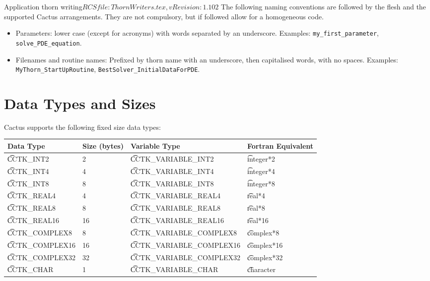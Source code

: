 \begin{cactuspart}{2}{Application thorn writing}{$RCSfile: ThornWriters.tex,v $}{$Revision: 1.102 $}
The following naming conventions are followed by the flesh and the
supported Cactus arrangements. They are not compulsory, but if followed
allow for a homogeneous code.

\begin{itemize}

\item Parameters: lower case (except for acronyms) with words separated
  by an underscore. Examples: {\tt my\_first\_parameter},
  {\tt solve\_PDE\_equation}.

\item Filenames and routine names: Prefixed by thorn name with an underscore, then capitalised words, with no spaces.
    Examples: {\tt MyThorn\_StartUpRoutine}, {\tt BestSolver\_InitialDataForPDE}.

\end{itemize}

\section{Data Types and Sizes}
\label{sect-ThornWriting/DataTypes}
\label{sec:datyansi}

Cactus supports the following fixed size data types:

\begin{center}
\begin{tabular}{|l|l|l|l|}
\hline
Data Type & Size (bytes) & Variable Type & Fortran Equivalent\\
\hline
{\t CCTK\_INT2}      & 2  & {\t CCTK\_VARIABLE\_INT2}      & {\t integer*2}\\
{\t CCTK\_INT4}      & 4  & {\t CCTK\_VARIABLE\_INT4}      & {\t integer*4}\\
{\t CCTK\_INT8}      & 8  & {\t CCTK\_VARIABLE\_INT8}      & {\t integer*8}\\
{\t CCTK\_REAL4}     & 4  & {\t CCTK\_VARIABLE\_REAL4}     & {\t real*4}\\
{\t CCTK\_REAL8}     & 8  & {\t CCTK\_VARIABLE\_REAL8}     & {\t real*8}\\
{\t CCTK\_REAL16}    & 16 & {\t CCTK\_VARIABLE\_REAL16}    & {\t real*16}\\
{\t CCTK\_COMPLEX8}  & 8  & {\t CCTK\_VARIABLE\_COMPLEX8}  & {\t complex*8}\\
{\t CCTK\_COMPLEX16} & 16 & {\t CCTK\_VARIABLE\_COMPLEX16} & {\t complex*16}\\
{\t CCTK\_COMPLEX32} & 32 & {\t CCTK\_VARIABLE\_COMPLEX32} & {\t complex*32}\\
{\t CCTK\_CHAR}      & 1  & {\t CCTK\_VARIABLE\_CHAR}      & {\t character} \\ \hline
\end{tabular}
\end{center}


\end{cactuspart}
